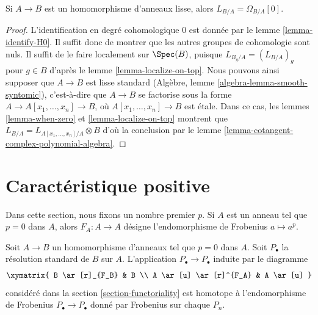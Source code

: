 \begin{lemma}
\label{lemma-when-projective}
Si $A \to B$ est un homomorphisme d'anneaux lisse, alors
$L_{B/A} = \Omega_{B/A}[0]$.
\end{lemma}

\begin{proof}
L'identification en degré cohomologique $0$ est donnée par le lemme
\ref{lemma-identify-H0}. Il suffit donc de montrer que les autres groupes de
cohomologie sont nuls. Il suffit de le faire localement sur $\Spec(B)$, puisque
$L_{B_g/A} = (L_{B/A})_g$ pour $g \in B$ d'après le lemme
\ref{lemma-localize-on-top}. Nous pouvons ainsi supposer que $A \to B$ est
lisse standard (Algèbre, lemme \ref{algebra-lemma-smooth-syntomic}),
c'est-à-dire que $A \to B$ se factorise sous la forme
$A \to A[x_1, \ldots, x_n] \to B$, où
$A[x_1, \ldots, x_n] \to B$ est \'etale. Dans ce cas, les lemmes
\ref{lemma-when-zero} et \ref{lemma-localize-on-top} montrent que
$L_{B/A} = L_{A[x_1, \ldots, x_n]/A} \otimes B$
d'où la conclusion par le lemme
\ref{lemma-cotangent-complex-polynomial-algebra}.
\end{proof}





\section{Caractéristique positive}
\label{section-positive-characteristic}

\noindent
Dans cette section, nous fixons un nombre premier $p$. Si $A$ est un anneau
tel que $p = 0$ dans $A$, alors $F_A : A \to A$ désigne l'endomorphisme de
Frobenius $a \mapsto a^p$.

\begin{lemma}
\label{lemma-frobenius-homotopy}
Soit $A \to B$ un homomorphisme d'anneaux tel que $p = 0$ dans $A$. Soit
$P_\bullet$ la résolution standard de $B$ sur $A$. L'application
$P_\bullet \to P_\bullet$ induite par le diagramme
$$
\xymatrix{
B \ar[r]_{F_B} & B \\
A \ar[u] \ar[r]^{F_A} & A \ar[u]
}
$$
considéré dans la section \ref{section-functoriality} est homotope à
l'endomorphisme de Frobenius $P_\bullet \to P_\bullet$ donné par Frobenius sur
chaque $P_n$.
\end{lemma}

